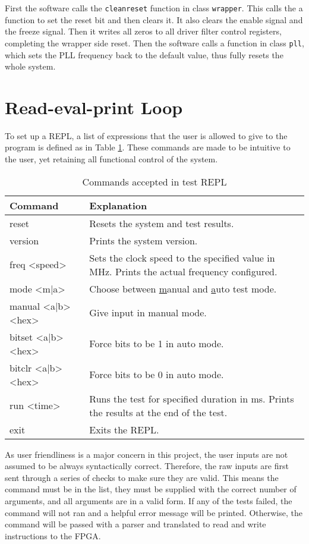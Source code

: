 First the software calls the \texttt{cleanreset} function in class \texttt{wrapper}.
This calls the a function to set the reset bit and then clears it.
It also clears the enable signal and the freeze signal.
Then it writes all zeros to all driver filter control registers, completing the wrapper side reset.
Then the software calls a function in class \texttt{pll}, which sets the PLL frequency back to the default value, thus fully resets the whole system.

\section{Read-eval-print Loop}

To set up a REPL, a list of expressions that the user is allowed to give to the program is defined as in Table \ref{REPL Commands}.
These commands are made to be intuitive to the user, yet retaining all functional control of the system.

\begin{table}[H]
  \centering
  \begin{tabular}{|>{\ttfamily}p{11em}|p{\dimexpr\textwidth-18em}|}
    \hline
    \textrm{Command}   & Explanation \\
    \hline
    reset              & Resets the system and test results. \\
    version            & Prints the system version. \\
    freq <speed>       & Sets the clock speed to the specified value in MHz. Prints the actual frequency configured. \\
    mode <m|a>         & Choose between \underline{m}anual and \underline{a}uto test mode. \\
    manual <a|b> <hex> & Give input in manual mode. \\
    bitset <a|b> <hex> & Force bits to be 1 in auto mode. \\
    bitclr <a|b> <hex> & Force bits to be 0 in auto mode. \\
    run <time>         & Runs the test for specified duration in ms. Prints the results at the end of the test. \\
    exit               & Exits the REPL. \\
    \hline
  \end{tabular}
  \caption{Commands accepted in test REPL}
  \label{REPL Commands}
\end{table}

As user friendliness is a major concern in this project, the user inputs are not assumed to be always syntactically correct.
Therefore, the raw inputs are first sent through a series of checks to make sure they are valid.
This means the command must be in the list, they must be supplied with the correct number of arguments, and all arguments are in a valid form.
If any of the tests failed, the command will not ran and a helpful error message will be printed.
Otherwise, the command will be passed with a parser and translated to read and write instructions to the FPGA.

